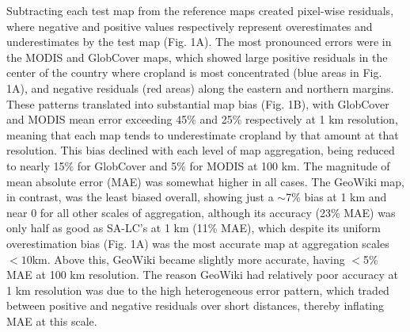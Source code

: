 \documentclass[a4paper]{article}
\begin{document}
Subtracting each test map from the reference maps created pixel-wise residuals, where negative and positive values respectively represent overestimates and underestimates by the test map (Fig. 1A). The most pronounced errors were in the MODIS and GlobCover maps, which showed large positive residuals in the center of the country where cropland is most concentrated (blue areas in Fig. 1A), and negative residuals (red areas) along the eastern and northern margins.
These patterns translated into substantial map bias (Fig. 1B), with GlobCover and MODIS mean error exceeding 45\% and 25\% respectively at 1 km resolution, meaning that each map tends to underestimate cropland by that amount at that resolution. This bias declined with each level of map aggregation, being reduced to nearly 15\% for GlobCover and 5\% for MODIS at 100 km. The magnitude of mean absolute error (MAE) was somewhat higher in all cases. The GeoWiki map, in contrast, was the least biased overall, showing just a $\sim$7\% bias at 1 km and near 0 for all other scales of aggregation, although its accuracy (23\% MAE) was only half as good as SA-LC's at 1 km (11\% MAE), which despite its uniform overestimation bias (Fig. 1A) was the most accurate map at aggregation scales $<10$km. Above this, GeoWiki became slightly more accurate, having $<$5\% MAE at 100 km resolution. The reason GeoWiki had relatively poor accuracy at 1 km resolution was due to the high heterogeneous error pattern, which traded between positive and negative residuals over short distances, thereby inflating MAE at this scale.  

\end{document}
